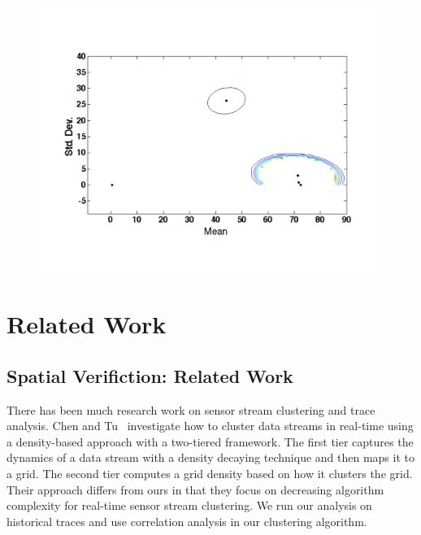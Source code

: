 \begin{figure}[t!] %
\centering
\includegraphics[width=1.0\columnwidth]{figs/gmm_centers}
\caption{}
\label{fig:tstreams}
\end{figure}


\section{Related Work}


\subsection{Spatial Verifiction: Related Work}
There has been much research work on sensor stream clustering and trace analysis. Chen and Tu~\cite{DStream} investigate 
how to cluster data streams in real-time using a density-based approach with a two-tiered framework. The first tier captures 
the dynamics of a data stream with a density decaying technique and then maps it to a grid.  The second tier computes a grid 
density based on how it clusters the grid. Their approach differs from ours in that they focus on decreasing algorithm 
complexity for real-time sensor stream clustering.  We run our analysis on historical traces and use correlation analysis
in our clustering algorithm.

